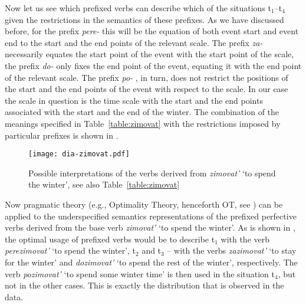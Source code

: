 Now let us see which prefixed verbs can describe which of the situations t$_1$--t$_4$ given the restrictions in the semantics of these prefixes. As we have discussed before, for the prefix \textit{pere-}   this will be the equation of both event start and event end to the start and the end points of the relevant scale. The prefix \textit{za-}   necessarily equates the start point of the event with the start point of the scale, the prefix \textit{do-}   only fixes the end point of the event, equating it with the end point of the relevant scale. The prefix \textit{po-}  , in turn, does not restrict the positions of the start and the end points of the event with respect to the scale. In our case the scale in question is the time scale with the start and the end points associated with the start and the end of the winter.  The combination of the meanings specified in Table~\ref{table:zimovat} with the restrictions imposed by particular prefixes is shown in .

\begin{figure}
\centering
\texttt{[image: dia-zimovat.pdf]}
\caption{Possible interpretations of the verbs derived from \textit{zimovat'} `to spend the winter', see also Table~\ref{table:zimovat} \label{fig:zimovat}}
\end{figure}

Now pragmatic theory (e.g., Optimality Theory, henceforth OT, see \citealt{Blutner:00, vanRooy:04, Benz:11}) can be applied to the underspecified semantics representations of the prefixed perfective verbs  derived from the base verb \textit{zimovat'} `to spend the winter'. As is shown in , the optimal usage of prefixed verbs would be to describe t$_1$ with the verb \textit{perezimovat'} `to spend the winter', t$_2$ and t$_3$ -- with the verbs \textit{zazimovat'} `to stay for the winter' and \textit{dozimovat'} `to spend the rest of the winter', respectively. The verb \textit{pozimovat'} `to spend some winter time' is then used in the situation t$_4$, but not in the other cases. This is exactly the distribution that is observed in the data. 

